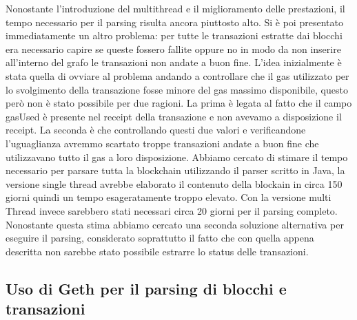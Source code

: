 \documentclass[12pt]{report}
\begin{document}
Nonostante l'introduzione del multithread e il miglioramento delle prestazioni, il tempo necessario per il parsing risulta ancora piuttosto alto.
\newline
Si è poi presentato immediatamente un altro problema: per tutte le transazioni estratte dai blocchi era necessario capire se queste fossero fallite oppure no in modo da non inserire all'interno del grafo le transazioni non andate a buon fine.
L'idea inizialmente è stata quella di ovviare al problema andando a controllare che il gas utilizzato per lo svolgimento della transazione fosse minore del gas massimo disponibile, questo però non è stato possibile per due ragioni. La prima è legata al fatto che il campo gasUsed è presente nel receipt della transazione e non avevamo a disposizione il receipt. La seconda è che controllando questi due valori e verificandone l'uguaglianza avremmo scartato troppe transazioni andate a buon fine che utilizzavano tutto il gas a loro disposizione. 
\newline
Abbiamo cercato di stimare il tempo necessario per parsare tutta la blockchain utilizzando il parser scritto in Java, la versione single thread avrebbe elaborato il contenuto della blockain in circa 150 giorni quindi un tempo esageratamente troppo elevato.
Con la versione multi Thread invece sarebbero stati necessari circa 20 giorni per il parsing completo.
Nonostante questa stima abbiamo cercato una seconda soluzione alternativa per eseguire il parsing, considerato soprattutto il fatto che con quella appena descritta non sarebbe stato possibile estrarre lo status delle transazioni.

\subsection {Uso di Geth per il parsing di blocchi e transazioni}
\end{document}
